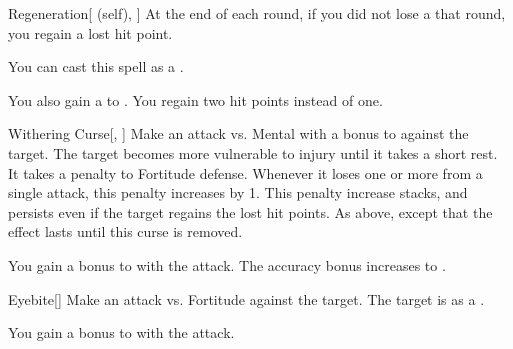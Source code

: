 \lowercase{\hypertarget{spell:Regeneration}{}}\label{spell:Regeneration}
\begin{attuneability}[Rank 4]{\hypertarget{spell:Regeneration}{Regeneration}}[ (self), ]
At the end of each round, if you did not lose a  that round, you regain a lost hit point.

You can cast this spell as a .

\rankline
{} You also gain a   to .
 You regain two hit points instead of one.

\end{attuneability}
\vspace{0.25em}



\lowercase{\hypertarget{spell:Withering Curse}{}}\label{spell:Withering Curse}
\begin{freeability}[Rank 4]{\hypertarget{spell:Withering Curse}{Withering Curse}}[, ]
Make an attack vs. Mental with a  bonus to  against the target.
\hit The target becomes more vulnerable to injury until it takes a short rest.
It takes a  penalty to Fortitude defense.
Whenever it loses one or more  from a single attack, this penalty increases by 1.
This penalty increase stacks, and persists even if the target regains the lost hit points.
\crit As above, except that the effect lasts until this curse is removed.

\rankline
{} You gain a  bonus to  with the attack.
 The accuracy bonus increases to .

\end{freeability}
\vspace{0.25em}



\lowercase{\hypertarget{spell:Eyebite}{}}\label{spell:Eyebite}
\begin{freeability}[Rank 5]{\hypertarget{spell:Eyebite}{Eyebite}}[]
Make an attack vs. Fortitude against the target.
\hit The target is  as a .

\rankline
{} You gain a  bonus to  with the attack.

\end{freeability}
\vspace{0.25em}



